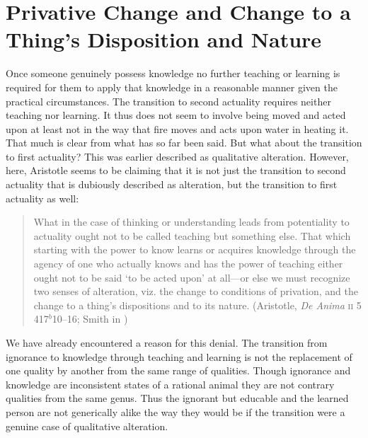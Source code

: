 \section{Privative Change and Change to a Thing's Disposition and Nature} %
\label{sec:privative_and_nonprivative_change}

Once someone genuinely possess knowledge no further teaching or learning is required for them to apply that knowledge in a reasonable manner given the practical circumstances. The transition to second actuality requires neither teaching nor learning. It thus does not seem to involve being moved and acted upon at least not in the way that fire moves and acts upon water in heating it. That much is clear from what has so far been said. But what about the transition to first actuality? This was earlier described as qualitative alteration. However, here, Aristotle seems to be claiming that it is not just the transition to second actuality that is dubiously described as alteration, but the transition to first actuality as well:
\begin{quote}
	What in the case of thinking or understanding leads from potentiality to actuality ought not to be called teaching but something else. That which starting with the power to know learns or acquires knowledge through the agency of one who actually knows and has the power of teaching either ought not to be said `to be acted upon' at all---or else we must recognize two senses of alteration, viz. the change to conditions of privation, and the change to a thing's dispositions and to its nature. (Aristotle, \emph{De Anima} \textsc{ii} 5 417\( ^{b} \)10--16; Smith in \citealt[30--31]{Barnes:1984uq})
\end{quote}
We have already encountered a reason for this denial. The transition from ignorance to knowledge through teaching and learning is not the replacement of one quality by another from the same range of qualities. Though ignorance and knowledge are inconsistent states of a rational animal they are not contrary qualities from the same genus. Thus the ignorant but educable and the learned person are not generically alike the way they would be if the transition were a genuine case of qualitative alteration. 

